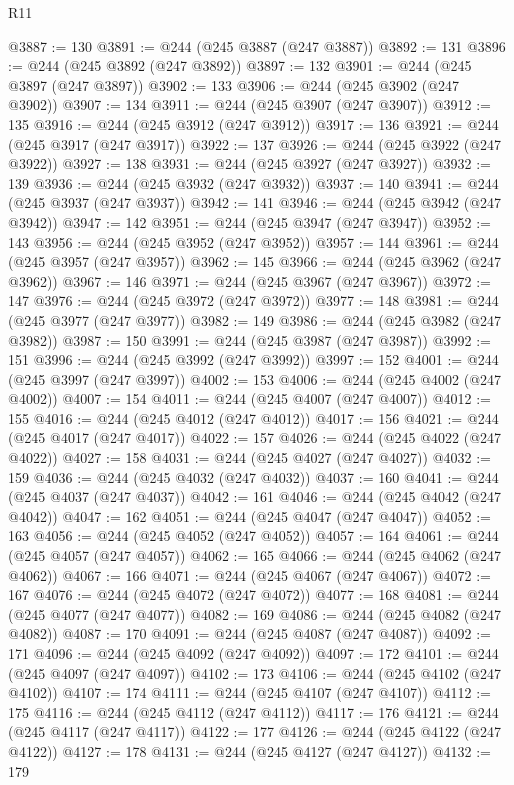 \begin{lexlean}{R11}
\begin{coremodule}
{{{{{{{{{{{{{{{{{{{{{{{{{{{{{{{{{{{{{{{{{{{{{{{{{{{{{{{{{{{{{{{{{{{{{{{{{{{{{{{{{{@3887 := 130
@3891 := @244 (@245 @3887 (@247 @3887))
@3892 := 131
@3896 := @244 (@245 @3892 (@247 @3892))
@3897 := 132
@3901 := @244 (@245 @3897 (@247 @3897))
@3902 := 133
@3906 := @244 (@245 @3902 (@247 @3902))
@3907 := 134
@3911 := @244 (@245 @3907 (@247 @3907))
@3912 := 135
@3916 := @244 (@245 @3912 (@247 @3912))
@3917 := 136
@3921 := @244 (@245 @3917 (@247 @3917))
@3922 := 137
@3926 := @244 (@245 @3922 (@247 @3922))
@3927 := 138
@3931 := @244 (@245 @3927 (@247 @3927))
@3932 := 139
@3936 := @244 (@245 @3932 (@247 @3932))
@3937 := 140
@3941 := @244 (@245 @3937 (@247 @3937))
@3942 := 141
@3946 := @244 (@245 @3942 (@247 @3942))
@3947 := 142
@3951 := @244 (@245 @3947 (@247 @3947))
@3952 := 143
@3956 := @244 (@245 @3952 (@247 @3952))
@3957 := 144
@3961 := @244 (@245 @3957 (@247 @3957))
@3962 := 145
@3966 := @244 (@245 @3962 (@247 @3962))
@3967 := 146
@3971 := @244 (@245 @3967 (@247 @3967))
@3972 := 147
@3976 := @244 (@245 @3972 (@247 @3972))
@3977 := 148
@3981 := @244 (@245 @3977 (@247 @3977))
@3982 := 149
@3986 := @244 (@245 @3982 (@247 @3982))
@3987 := 150
@3991 := @244 (@245 @3987 (@247 @3987))
@3992 := 151
@3996 := @244 (@245 @3992 (@247 @3992))
@3997 := 152
@4001 := @244 (@245 @3997 (@247 @3997))
@4002 := 153
@4006 := @244 (@245 @4002 (@247 @4002))
@4007 := 154
@4011 := @244 (@245 @4007 (@247 @4007))
@4012 := 155
@4016 := @244 (@245 @4012 (@247 @4012))
@4017 := 156
@4021 := @244 (@245 @4017 (@247 @4017))
@4022 := 157
@4026 := @244 (@245 @4022 (@247 @4022))
@4027 := 158
@4031 := @244 (@245 @4027 (@247 @4027))
@4032 := 159
@4036 := @244 (@245 @4032 (@247 @4032))
@4037 := 160
@4041 := @244 (@245 @4037 (@247 @4037))
@4042 := 161
@4046 := @244 (@245 @4042 (@247 @4042))
@4047 := 162
@4051 := @244 (@245 @4047 (@247 @4047))
@4052 := 163
@4056 := @244 (@245 @4052 (@247 @4052))
@4057 := 164
@4061 := @244 (@245 @4057 (@247 @4057))
@4062 := 165
@4066 := @244 (@245 @4062 (@247 @4062))
@4067 := 166
@4071 := @244 (@245 @4067 (@247 @4067))
@4072 := 167
@4076 := @244 (@245 @4072 (@247 @4072))
@4077 := 168
@4081 := @244 (@245 @4077 (@247 @4077))
@4082 := 169
@4086 := @244 (@245 @4082 (@247 @4082))
@4087 := 170
@4091 := @244 (@245 @4087 (@247 @4087))
@4092 := 171
@4096 := @244 (@245 @4092 (@247 @4092))
@4097 := 172
@4101 := @244 (@245 @4097 (@247 @4097))
@4102 := 173
@4106 := @244 (@245 @4102 (@247 @4102))
@4107 := 174
@4111 := @244 (@245 @4107 (@247 @4107))
@4112 := 175
@4116 := @244 (@245 @4112 (@247 @4112))
@4117 := 176
@4121 := @244 (@245 @4117 (@247 @4117))
@4122 := 177
@4126 := @244 (@245 @4122 (@247 @4122))
@4127 := 178
@4131 := @244 (@245 @4127 (@247 @4127))
@4132 := 179
}}}}}}}}}}}}}}}}}}}}}}}}}}}}}}}}}}}}}}}}}}}}}}}}}}}}}}}}}}}}}}}}}}}}}}}}}}}}}}}}}}
\end{coremodule}
\end{lexlean}
